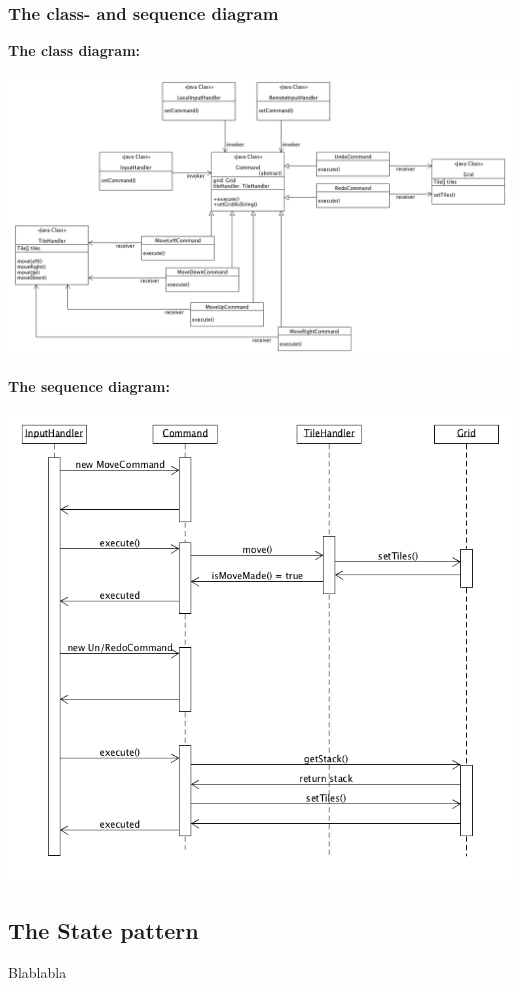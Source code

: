 \documentclass[a4paper,11pt,report]{scrartcl}
\begin{document}
\newpage
\subsubsection{The class- and sequence diagram}
\textbf{The class diagram:}\\
\centerline{\includegraphics[scale=0.4]{commandPatternUML}}

\newpage\textbf{The sequence diagram:}\\
\centerline{\includegraphics[scale=0.5]{commandPatternSequence}}

\newpage\subsection{The State pattern}
Blablabla
\end{document}

